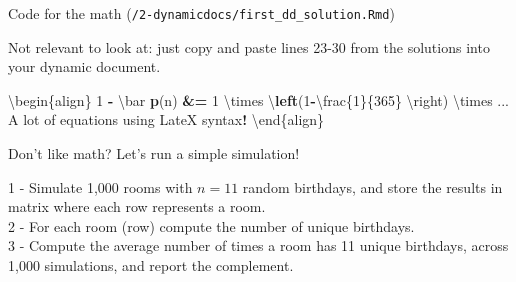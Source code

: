 \documentclass[ignorenonframetext,]{beamer}
\newenvironment{Shaded}{\begin{snugshade}}{\end{snugshade}}
\newcommand{\DecValTok}[1]{\textcolor[rgb]{0.00,0.00,0.81}{#1}}
\newcommand{\ErrorTok}[1]{\textcolor[rgb]{0.64,0.00,0.00}{\textbf{#1}}}
\newcommand{\KeywordTok}[1]{\textcolor[rgb]{0.13,0.29,0.53}{\textbf{#1}}}
\newcommand{\NormalTok}[1]{#1}
\newcommand{\OperatorTok}[1]{\textcolor[rgb]{0.81,0.36,0.00}{\textbf{#1}}}
\newcommand{\StringTok}[1]{\textcolor[rgb]{0.31,0.60,0.02}{#1}}
\begin{document}
\begin{frame}[fragile]{Code for the math
(\texttt{/2-dynamicdocs/first\_dd\_solution.Rmd})}
\protect\hypertarget{code-for-the-math-2-dynamicdocsfirst_dd_solution.rmd}{}

Not relevant to look at: just copy and paste lines 23-30 from the
solutions into your dynamic document.

\begin{Shaded}
\begin{Highlighting}[]
\NormalTok{\textbackslash{}begin\{align\} }
 \DecValTok{1} \OperatorTok{-}\StringTok{ }\NormalTok{\textbackslash{}bar }\KeywordTok{p}\NormalTok{(n) }\OperatorTok{&}\ErrorTok{=}\StringTok{ }\DecValTok{1}\NormalTok{ \textbackslash{}times \textbackslash{}}\KeywordTok{left}\NormalTok{(}\DecValTok{1}\OperatorTok{-}\NormalTok{\textbackslash{}frac\{}\DecValTok{1}\NormalTok{\}\{}\DecValTok{365}\NormalTok{\}}
\NormalTok{                                 \textbackslash{}right) }
\NormalTok{ \textbackslash{}times ...}
\NormalTok{ A lot of equations using LateX syntax}\OperatorTok{!}
\NormalTok{\textbackslash{}end\{align\}}
\end{Highlighting}
\end{Shaded}

\end{frame}

\begin{frame}{Don't like math? Let's run a simple simulation!}
\protect\hypertarget{dont-like-math-lets-run-a-simple-simulation}{}

1 - Simulate 1,000 rooms with \(n = 11\) random birthdays, and store the
results in matrix where each row represents a room.\\
2 - For each room (row) compute the number of unique birthdays.\\
3 - Compute the average number of times a room has 11 unique birthdays,
across 1,000 simulations, and report the complement.

\end{frame}
\end{document}
